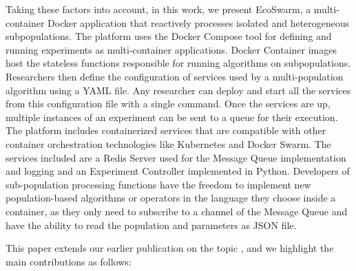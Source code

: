 \documentclass[review]{elsarticle}
\begin{document}
Taking these factors into account, in this work, we present EcoSwarm, %
a multi-container Docker application that reactively processes isolated and
heterogeneous subpopulations. The platform uses the Docker Compose tool for
defining and running experiments as multi-container applications. 
Docker Container images host the stateless functions responsible for running algorithms
on subpopulations. Researchers then define the configuration of services used by
a multi-population algorithm using a YAML file. Any researcher can deploy and
start all the services from this configuration file with a single command. Once
the services are up, multiple instances of an experiment can be sent to a queue
for their execution. The platform includes containerized services that are
compatible with other container orchestration technologies like Kubernetes and
Docker Swarm. The services included are a Redis Server used for the Message
Queue implementation and logging and an Experiment Controller implemented in
Python. Developers of sub-population processing functions have the freedom to
implement new population-based algorithms or operators in the language they
choose inside a container, as they only need to subscribe to a channel of the
Message Queue and have the ability to read the population and parameters as JSON  
file.

This paper extends our earlier publication on the topic
\cite{guervos2018introducing}, and we highlight the main contributions as
follows:
\end{document}
